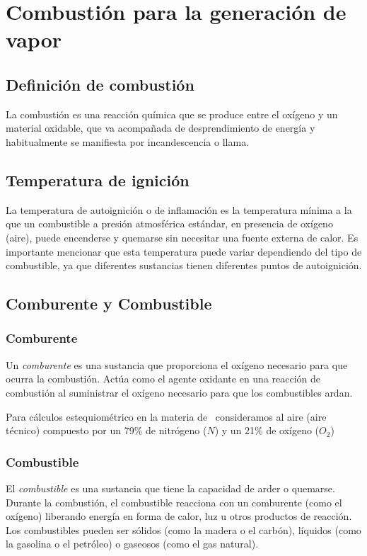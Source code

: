 \section{Combustión para la generación de vapor}

\subsection{Definición de combustión}
La combustión es una reacción química que se produce entre el oxígeno y un material oxidable, que va acompañada de desprendimiento de energía y habitualmente se manifiesta por incandescencia o llama.

\subsection{Temperatura de ignición}


La temperatura de autoignición o de inflamación es la temperatura mínima a la que un combustible a presión atmosférica estándar, en presencia de oxígeno (aire), puede encenderse y quemarse sin necesitar una fuente externa de calor. Es importante mencionar que esta temperatura puede variar dependiendo del tipo de combustible, ya que diferentes sustancias tienen diferentes puntos de autoignición.

\subsection{Comburente y Combustible}

\subsubsection{Comburente}
Un \emph{comburente} es una sustancia que proporciona el oxígeno necesario para que ocurra la combustión. Actúa como el agente oxidante en una reacción de combustión al suministrar el oxígeno necesario para que los combustibles ardan.


Para cálculos estequiométrico en la materia de \materia\ consideramos al aire (aire técnico) compuesto por un 79\% de nitrógeno ($N$) y un 21\% de oxígeno ($O_2$)

\subsubsection{Combustible}
El \emph{combustible} es una sustancia que tiene la capacidad de arder o quemarse. Durante la combustión, el combustible reacciona con un comburente (como el oxígeno) liberando energía en forma de calor, luz u otros productos de reacción. Los combustibles pueden ser sólidos (como la madera o el carbón), líquidos (como la gasolina o el petróleo) o gaseosos (como el gas natural).


